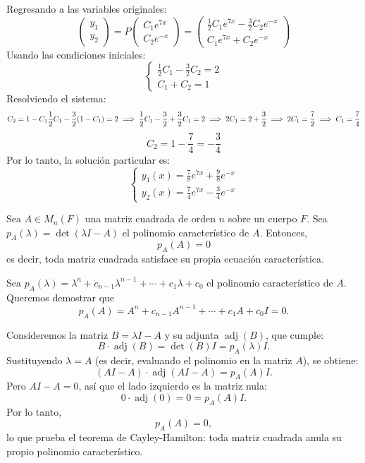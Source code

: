 \begin{example}
\begin{myproof}
Regresando a las variables originales:
\[
\begin{pmatrix}
y_1 \\ y_2
\end{pmatrix}
= P
\begin{pmatrix}
C_1 e^{7x} \\ C_2 e^{-x}
\end{pmatrix}
= \begin{pmatrix}
\frac{1}{2} C_1 e^{7x} - \frac{3}{2} C_2 e^{-x} \\
C_1 e^{7x} + C_2 e^{-x}
\end{pmatrix}
\]
Usando las condiciones iniciales:
\[
\begin{cases}
\frac{1}{2} C_1 - \frac{3}{2} C_2 = 2 \\
C_1 + C_2 = 1
\end{cases}
\]
Resolviendo el sistema:
\[
C_2 = 1 - C_1 \\
\frac{1}{2} C_1 - \frac{3}{2} (1 - C_1) = 2 \implies \frac{1}{2} C_1 - \frac{3}{2} + \frac{3}{2} C_1 = 2 \implies 2 C_1 = 2 + \frac{3}{2} \implies 2C_1 = \frac{7}{2} \implies C_1 = \frac{7}{4}
\]
\[
C_2 = 1 - \frac{7}{4} = -\frac{3}{4}
\]
Por lo tanto, la solución particular es:
\[
\boxed{
\begin{cases}
y_1(x) = \frac{7}{8} e^{7x} + \frac{9}{8} e^{-x} \\
y_2(x) = \frac{7}{4} e^{7x} - \frac{3}{4} e^{-x}
\end{cases}
}
\]
\end{myproof}
\end{example}

\begin{theorem}
Sea $A \in M_n(F)$ una matriz cuadrada de orden $n$ sobre un cuerpo $F$. Sea $p_A(\lambda) = \det(\lambda I - A)$ el polinomio característico de $A$. Entonces,
\[
p_A(A) = 0
\]
es decir, toda matriz cuadrada satisface su propia ecuación característica.
\end{theorem}

\begin{myproof}
Sea $p_A(\lambda) = \lambda^n + c_{n-1}\lambda^{n-1} + \cdots + c_1\lambda + c_0$ el polinomio característico de $A$. Queremos demostrar que
\[
p_A(A) = A^n + c_{n-1}A^{n-1} + \cdots + c_1A + c_0 I = 0.
\]

Consideremos la matriz $B = \lambda I - A$ y su adjunta $\operatorname{adj}(B)$, que cumple:
\[
B \cdot \operatorname{adj}(B) = \det(B) I = p_A(\lambda) I.
\]
Sustituyendo $\lambda = A$ (es decir, evaluando el polinomio en la matriz $A$), se obtiene:
\[
(AI - A) \cdot \operatorname{adj}(AI - A) = p_A(A) I.
\]
Pero $AI - A = 0$, así que el lado izquierdo es la matriz nula:
\[
0 \cdot \operatorname{adj}(0) = 0 = p_A(A) I.
\]
Por lo tanto,
\[
p_A(A) = 0,
\]
lo que prueba el teorema de Cayley-Hamilton: toda matriz cuadrada anula su propio polinomio característico.
\end{myproof}

